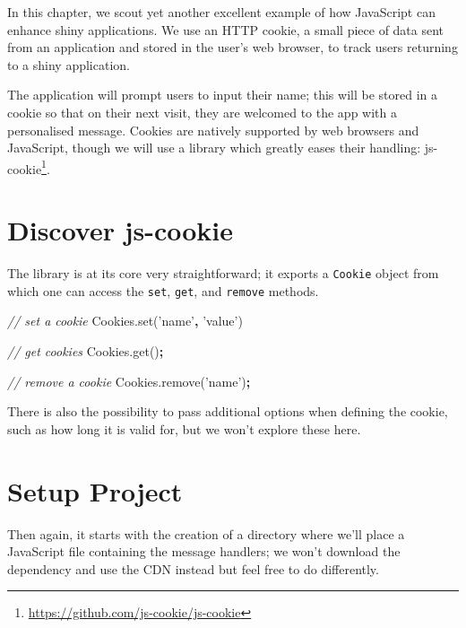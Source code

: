\documentclass[10pt,]{krantz}
\makeatletter
\newenvironment{Shaded}{\begin{snugshade}}{\end{snugshade}}
\newcommand{\AttributeTok}[1]{\textcolor[rgb]{0.61,0.61,0.61}{#1}}
\newcommand{\CommentTok}[1]{\textcolor[rgb]{0.37,0.37,0.37}{\textit{#1}}}
\newcommand{\NormalTok}[1]{#1}
\newcommand{\OperatorTok}[1]{\textcolor[rgb]{0.43,0.43,0.43}{\textbf{#1}}}
\newcommand{\StringTok}[1]{\textcolor[rgb]{0.5,0.5,0.5}{#1}}
\newcommand{\VariableTok}[1]{\textcolor[rgb]{0,0,0}{#1}}
\renewcommand{\href}[2]{#2\footnote{\url{#1}}}
\newenvironment{kframe}{%
\medskip{}
\setlength{\fboxsep}{.8em}
 \def\at@end@of@kframe{}%
 \ifinner\ifhmode%
  \def\at@end@of@kframe{\end{minipage}}%
  \begin{minipage}{\columnwidth}%
 \fi\fi%
 \def\FrameCommand##1{\hskip\@totalleftmargin \hskip-\fboxsep
 \colorbox{shadecolor}{##1}\hskip-\fboxsep
     \hskip-\linewidth \hskip-\@totalleftmargin \hskip\columnwidth}%
 \MakeFramed {\advance\hsize-\width
   \@totalleftmargin\z@ \linewidth\hsize
   \@setminipage}}%
 {\par\unskip\endMakeFramed%
 \at@end@of@kframe}
\renewenvironment{Shaded}{\begin{kframe}}{\end{kframe}}
\makeatother
\begin{document}
In this chapter, we scout yet another excellent example of how JavaScript can enhance shiny applications. We use an HTTP cookie, a small piece of data sent from an application and stored in the user's web browser, to track users returning to a shiny application.

The application will prompt users to input their name; this will be stored in a cookie so that on their next visit, they are welcomed to the app with a personalised message. Cookies are natively supported by web browsers and JavaScript, though we will use a library which greatly eases their handling: \href{https://github.com/js-cookie/js-cookie}{js-cookie}.

\hypertarget{shiny-cookies-discover}{%
\section{Discover js-cookie}\label{shiny-cookies-discover}}

The library is at its core very straightforward; it exports a \texttt{Cookie} object from which one can access the \texttt{set}, \texttt{get}, and \texttt{remove} methods.

\begin{Shaded}
\begin{Highlighting}[]
\CommentTok{// set a cookie}
\VariableTok{Cookies}\NormalTok{.}\AttributeTok{set}\NormalTok{(}\StringTok{'name'}\OperatorTok{,} \StringTok{'value'}\NormalTok{)}

\CommentTok{// get cookies}
\VariableTok{Cookies}\NormalTok{.}\AttributeTok{get}\NormalTok{()}\OperatorTok{;}

\CommentTok{// remove a cookie}
\VariableTok{Cookies}\NormalTok{.}\AttributeTok{remove}\NormalTok{(}\StringTok{'name'}\NormalTok{)}\OperatorTok{;}
\end{Highlighting}
\end{Shaded}

There is also the possibility to pass additional options when defining the cookie, such as how long it is valid for, but we won't explore these here.

\hypertarget{shiny-cookies-setup}{%
\section{Setup Project}\label{shiny-cookies-setup}}

Then again, it starts with the creation of a directory where we'll place a JavaScript file containing the message handlers; we won't download the dependency and use the CDN instead but feel free to do differently.
\end{document}
